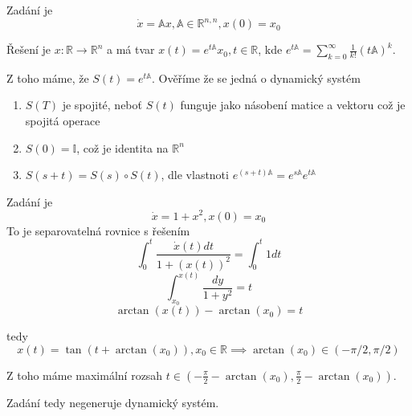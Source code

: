 \documentclass[../main.tex]{subfiles}
\begin{document}
\begin{example}
    Zadání je 
    \begin{equation}
        \dot{x} = \mathbb{A}x, \mathbb{A}\in \mathbb{R}^{n,n}, x(0)= x_0
    \end{equation}
    
    Řešení je $x: \mathbb{R} \rightarrow \mathbb{R}^n$ a má tvar
    $x(t) = e^{t \mathbb{A}}x_0, t\in \mathbb{R}$, kde $e^{t\mathbb{A}} = \sum_{k=0}^{\infty} \frac{1}{k!} \left(t \mathbb{A}\right)^k$.

    Z toho máme, že $S(t) = e^{t\mathbb{A}}$. Ověříme že se jedná o dynamický systém
    \begin{enumerate}
        \item $S(T)$ je spojité, neboť $S(t)$ funguje jako násobení matice a vektoru což je spojitá operace
        \item $S(0) = \mathbb{I}$, což je identita na $\mathbb{R}^n$
        \item $S(s+t) = S(s) \circ S(t)$, dle vlastnoti $e^{(s+t)\mathbb{A}} = e^{s\mathbb{A}}e^{t\mathbb{A}}$
    \end{enumerate}

\end{example}

\begin{example}
    Zadání je 
    \begin{equation}
        \dot{x} = 1+x^2, x(0)=x_0
    \end{equation}
    To je separovatelná rovnice s řešením 
    \begin{equation}
        \int_{0}^{t} \frac{\dot{x}(t)dt}{1+(x(t))^2} = \int_0^t 1 dt
    \end{equation}
    \begin{equation}
        \int_{x_0}^{x(t)} \frac{dy}{1 + y^2} = t 
    \end{equation}
    \begin{equation}
        \arctan(x(t)) - \arctan(x_0) = t
    \end{equation}

    tedy 
    \begin{equation}
        x(t) = \tan(t + \arctan(x_0)), x_0 \in \mathbb{R} \implies \arctan(x_0)\in (-\pi/2, \pi/2)
    \end{equation}

    Z toho máme maximální  rozsah $t\in \left(- \frac{\pi}{2} - \arctan(x_0), \frac{\pi}{2} - \arctan(x_0)\right)$.

    Zadání tedy negeneruje dynamický systém.

\end{example}
\end{document}
